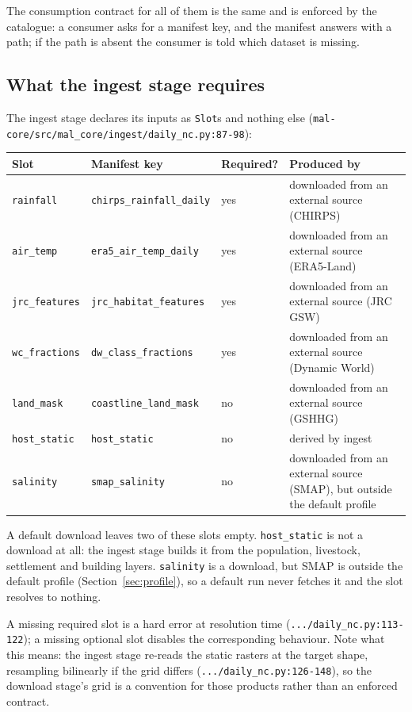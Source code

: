\documentclass[11pt,a4paper]{article}
\newcommand{\code}[1]{\texttt{#1}}
\begin{document}
The consumption contract for all of them is the same and is enforced by the
catalogue: a consumer asks for a manifest key, and the manifest answers with
a path; if the path is absent the consumer is told which dataset is missing.

\subsection{What the ingest stage requires}

The ingest stage declares its inputs as \code{Slot}s and nothing else
(\code{mal-core/src/mal\_core/ingest/daily\_nc.py:87-98}):

\begin{longtable}{@{}lllp{}@{}}
\toprule
Slot & Manifest key & Required? & Produced by \\
\midrule
\endhead
\code{rainfall} & \code{chirps\_rainfall\_daily} & yes & downloaded from an
external source (CHIRPS) \\
\code{air\_temp} & \code{era5\_air\_temp\_daily} & yes & downloaded from an
external source (ERA5-Land) \\
\code{jrc\_features} & \code{jrc\_habitat\_features} & yes & downloaded from
an external source (JRC GSW) \\
\code{wc\_fractions} & \code{dw\_class\_fractions} & yes & downloaded from an
external source (Dynamic World) \\
\code{land\_mask} & \code{coastline\_land\_mask} & no & downloaded from an
external source (GSHHG) \\
\code{host\_static} & \code{host\_static} & no & derived by ingest \\
\code{salinity} & \code{smap\_salinity} & no & downloaded from an external
source (SMAP), but outside the default profile \\
\bottomrule
\end{longtable}

A default download leaves two of these slots empty. \code{host\_static} is
not a download at all: the ingest stage builds it from the population,
livestock, settlement and building layers. \code{salinity} is a download, but
SMAP is outside the default profile (Section~\ref{sec:profile}), so a default
run never fetches it and the slot resolves to nothing.

A missing required slot is a hard error at resolution time
(\code{.../daily\_nc.py:113-122}); a missing optional slot disables the
corresponding behaviour. Note what this means: the ingest stage re-reads the
static rasters at the target shape, resampling bilinearly if the grid differs
(\code{.../daily\_nc.py:126-148}), so the download stage's grid is a
convention for those products rather than an enforced contract.
\end{document}
